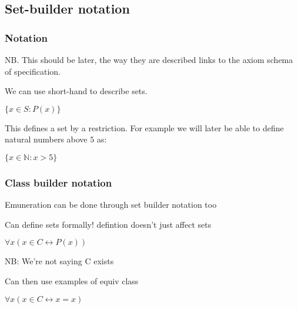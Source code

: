 
\subsection{Set-builder notation}

\subsubsection{Notation}

NB. This should be later, the way they are described links to the axiom schema of specification.

We can use short-hand to describe sets.

$\{x\in S: P(x)\}$

This defines a set by a restriction. For example we will later be able to define natural numbers above \(5\) as:

$\{x\in \mathbb{N} : x>5\}$

\subsubsection{Class builder notation}

Emuneration can be done through set builder notation too

Can define sets formally! defintion doesn't just affect sets

\(\forall x (x\in C \leftrightarrow P(x))\)

NB: We're not saying C exists

Can then use examples of equiv class

\(\forall x (x\in C \leftrightarrow x=x)\)

